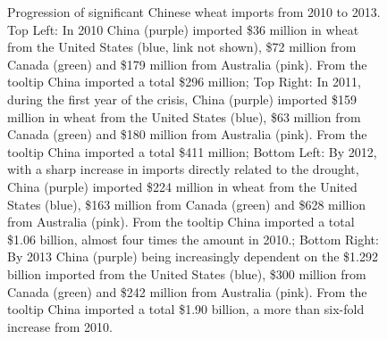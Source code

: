 \begin{figure}[htb]
	\caption[PROGRESSION OF SIGNIFICANT CHINESE WHEAT IMPORTS FROM 2010 TO 2013]{Progression of significant Chinese wheat imports from 2010 to 2013. Top Left: {In 2010 China (purple) imported \$36 million in wheat from the United States (blue, link not shown), \$72 million from Canada (green) and \$179 million from Australia (pink). From the tooltip China imported a total \$296 million}; Top Right: {In 2011, during the first year of the crisis, China (purple) imported \$159 million in wheat from the United States (blue), \$63 million from Canada (green) and \$180 million from Australia (pink). From the tooltip China imported a total \$411 million}; Bottom Left: {By 2012, with a sharp increase in imports directly related to the drought, China (purple) imported \$224 million in wheat from the United States (blue), \$163 million from Canada (green) and \$628 million from Australia (pink). From the tooltip China imported a total \$1.06 billion, almost four times the amount in 2010.}; Bottom Right: {By 2013 China (purple) being increasingly dependent on the \$1.292 billion imported from the United States (blue), \$300 million from Canada (green) and \$242 million from Australia (pink). From the tooltip China imported a total \$1.90 billion, a more than six-fold increase from 2010. }}
	\label{china2010-2013}
\end{figure}
\clearpage
